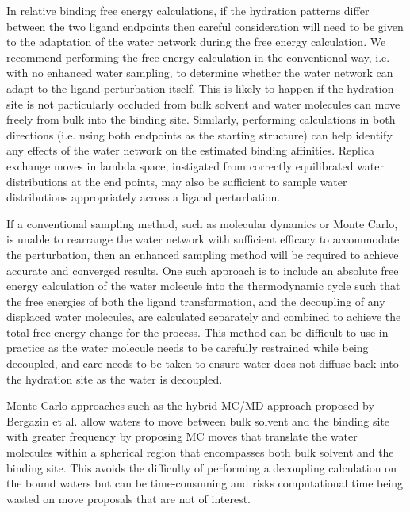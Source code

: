 \documentclass[9pt,bestpractices]{livecoms}
\begin{document}
In relative binding free energy calculations, if the hydration patterns differ between the two ligand endpoints then careful consideration will need to be given to the adaptation of the water network during the free energy calculation. We recommend performing the free energy calculation in the conventional way, i.e. with no enhanced water sampling, to determine whether the water network can adapt to the ligand perturbation itself. This is likely to happen if the hydration site is not particularly occluded from bulk solvent and water molecules can move freely from bulk into the binding site. Similarly, performing calculations in both directions (i.e. using both endpoints as the starting structure) can help identify any effects of the water network on the estimated binding affinities. Replica exchange moves in lambda space, instigated from correctly equilibrated water distributions at the end points, may also be sufficient to sample water distributions appropriately across a ligand perturbation.

If a conventional sampling method, such as molecular dynamics or Monte Carlo, is unable to rearrange the water network with sufficient efficacy to accommodate the perturbation, then an enhanced sampling method will be required to achieve accurate and converged results. One such approach is to include an absolute free energy calculation of the water molecule into the thermodynamic cycle\cite{ross2020enhancing, hamelberg2004standard, barillari2007classification, yu2008free, ge2022abfewat} such that the free energies of both the ligand transformation, and the decoupling of any displaced water molecules, are calculated separately and combined to achieve the total free energy change for the process. This method can be difficult to use in practice as the water molecule needs to be carefully restrained while being decoupled, and care needs to be taken to ensure water does not diffuse back into the hydration site as the water is decoupled.

Monte Carlo approaches such as the hybrid MC/MD approach proposed by Bergazin et al.\cite{bergazin2021enhancing, ben-shalom2021fast, ge2022enhancing} allow waters to move between bulk solvent and the binding site with greater frequency by proposing MC moves that translate the water molecules within a spherical region that encompasses both bulk solvent and the binding site. This avoids the difficulty of performing a decoupling calculation on the bound waters but can be time-consuming and risks computational time being wasted on move proposals that are not of interest.
\end{document}

